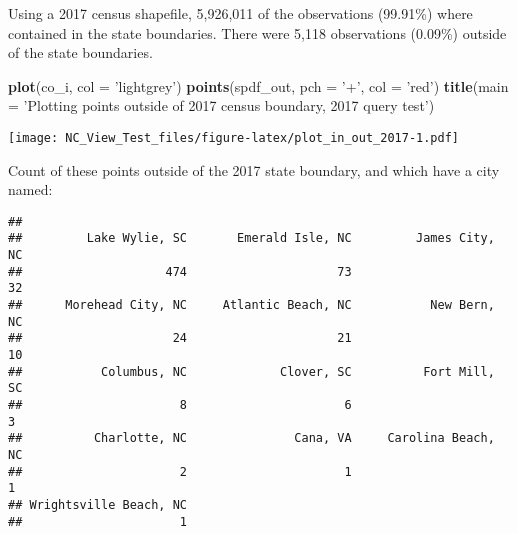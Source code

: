 \documentclass[]{article}
\newenvironment{Shaded}{\begin{snugshade}}{\end{snugshade}}
\newcommand{\DataTypeTok}[1]{\textcolor[rgb]{0.13,0.29,0.53}{#1}}
\newcommand{\KeywordTok}[1]{\textcolor[rgb]{0.13,0.29,0.53}{\textbf{#1}}}
\newcommand{\NormalTok}[1]{#1}
\newcommand{\OperatorTok}[1]{\textcolor[rgb]{0.81,0.36,0.00}{\textbf{#1}}}
\newcommand{\StringTok}[1]{\textcolor[rgb]{0.31,0.60,0.02}{#1}}
\begin{document}
Using a 2017 census shapefile, 5,926,011 of the observations (99.91\%)
where contained in the state boundaries. There were 5,118 observations
(0.09\%) outside of the state boundaries.

\begin{Shaded}
\begin{Highlighting}[]
\KeywordTok{plot}\NormalTok{(co_i, }\DataTypeTok{col =} \StringTok{'lightgrey'}\NormalTok{)}
\KeywordTok{points}\NormalTok{(spdf_out, }\DataTypeTok{pch =} \StringTok{'+'}\NormalTok{, }\DataTypeTok{col =} \StringTok{'red'}\NormalTok{)}
\KeywordTok{title}\NormalTok{(}\DataTypeTok{main =} \StringTok{'Plotting points outside of 2017 census boundary, 2017 query test'}\NormalTok{)}
\end{Highlighting}
\end{Shaded}

\texttt{[image: NC\_View\_Test\_files/figure-latex/plot\_in\_out\_2017-1.pdf]}

Count of these points outside of the 2017 state boundary, and which have
a city named:

\begin{Shaded}
\end{Shaded}

\begin{verbatim}
## 
##         Lake Wylie, SC       Emerald Isle, NC         James City, NC 
##                    474                     73                     32 
##      Morehead City, NC     Atlantic Beach, NC           New Bern, NC 
##                     24                     21                     10 
##           Columbus, NC             Clover, SC          Fort Mill, SC 
##                      8                      6                      3 
##          Charlotte, NC               Cana, VA     Carolina Beach, NC 
##                      2                      1                      1 
## Wrightsville Beach, NC 
##                      1
\end{verbatim}
\end{document}
